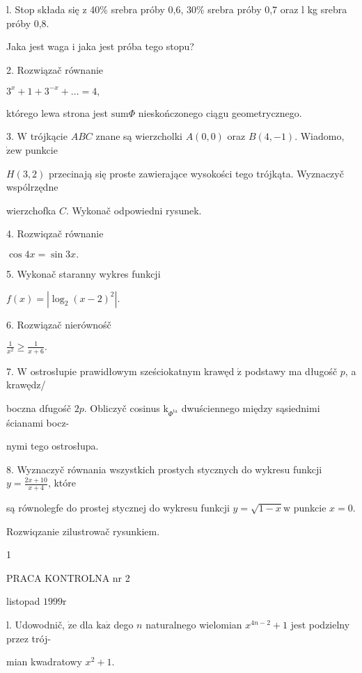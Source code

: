 \documentclass[a4paper,12pt]{article}
\begin{document}
l. Stop składa się $\mathrm{z}$ 40\% srebra próby 0,6, 30\% srebra próby 0,7 oraz l kg srebra próby 0,8.

Jaka jest waga $\mathrm{i}$ jaka jest próba tego stopu?

2. Rozwiązač równanie

$3^{x}+1+3^{-x}+\ldots=4,$

którego lewa strona jest $\mathrm{s}\mathrm{u}\mathrm{m}\Phi$ nieskończonego ciągu geometrycznego.

3. $\mathrm{W}$ trójkącie $ABC$ znane są wierzcholki $A(0,0)$ oraz $B(4,-1)$. Wiadomo, $\dot{\mathrm{z}}\mathrm{e}\mathrm{w}$ punkcie

$H(3,2)$ przecinają się proste zawierające wysokości tego trójkąta. Wyznaczyč wspólrzędne

wierzchofka $C$. Wykonač odpowiedni rysunek.

4. Rozwiqzač równanie

$\cos 4x=\sin 3x.$

5. Wykonač staranny wykres funkcji

$f(x)=|\log_{2}(x-2)^{2}|.$

6. Rozwiązač nierównośč

$\displaystyle \frac{1}{x^{2}}\geq\frac{1}{x+6}.$

7. $\mathrm{W}$ ostrosłupie prawidłowym sześciokatnym krawęd $\acute{\mathrm{z}}$ podstawy ma długośč $p$, a krawędz/

boczna dfugośč $2p$. Obliczyč cosinus $\mathrm{k}_{\Phi^{\mathrm{t}\mathrm{a}}}$ dwuściennego między sąsiednimi ścianami bocz-

nymi tego ostrosłupa.

8. Wyznaczyč równania wszystkich prostych stycznych do wykresu funkcji $y=\displaystyle \frac{2x+10}{x+4}$, które

są równolegfe do prostej stycznej do wykresu funkcji $y = \sqrt{1-x}\mathrm{w}$ punkcie $x = 0.$

Rozwiqzanie zilustrowač rysunkiem.

1





PRACA KONTROLNA nr 2

listopad $1999\mathrm{r}$

l. Udowodnič, $\dot{\mathrm{z}}\mathrm{e}$ dla $\mathrm{k}\mathrm{a}\dot{\mathrm{z}}$ dego $n$ naturalnego wielomian $x^{4n-2}+1$ jest podzielny przez trój-

mian kwadratowy $x^{2}+1.$
\end{document}
